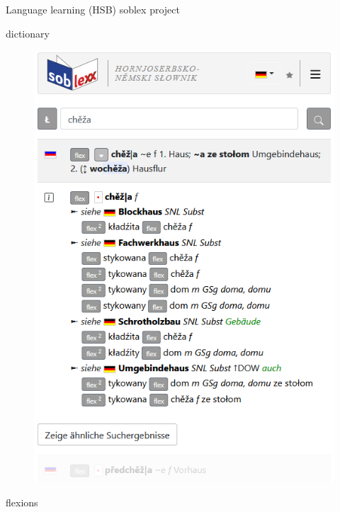 \documentclass[final]{beamer}
\newlength{\colwidth}
\begin{document}
\begin{frame}[t]
\begin{columns}[t]
\begin{column}{\colwidth}
\begin{block}{Language learning (HSB)}
    soblex project\cite{soblex}

    dictionary

    \begin{figure}
        \centering
        \includegraphics[width=0.7\colwidth]{soblex_suche.png}
        \label{fig:soblexsearch}
    \end{figure}

    flexions


\end{block}
\end{column}
\end{columns}
\end{frame}
\end{document}
